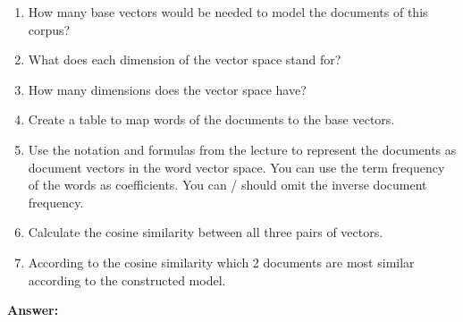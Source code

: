 \documentclass{WeSTassignment}
\begin{document}
\begin{enumerate}
\item How many base vectors would be needed to model the documents of this corpus?
\item What does each dimension of the vector space stand for?
\item How many dimensions does the vector space have? 
\item Create a table to map words of the documents to the base vectors.
\item Use the notation and formulas from the lecture to represent the documents as document vectors in the word vector space. You can use the term frequency of the words as coefficients. You can / should omit the inverse document frequency.
\item Calculate the cosine similarity between all three pairs of vectors.
\item According to the cosine similarity which 2 documents are most similar according to the constructed model. 
\end{enumerate}

\textbf{Answer:}
\end{document}
